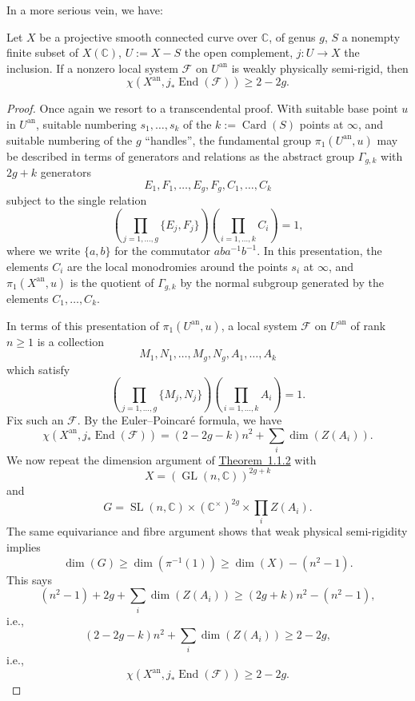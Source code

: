 In a more serious vein, we have:

\setcounter{theorem}{2}
\begin{proposition}
\label{prop:1.2.3}
Let \(X\) be a projective smooth connected curve over \(\mathbb{C}\), of genus
\(g\), \(S\) a nonempty finite subset of \(X(\mathbb{C})\),
\(U:=X-S\) the open complement, \(j:U\to X\) the inclusion. If a nonzero local
system \(\mathcal{F}\) on \(U^{\mathrm{an}}\) is weakly physically semi-rigid,
then
\[
  \chi(X^{\mathrm{an}},j_*\operatorname{End}(\mathcal{F}))\geq 2-2g.
\]
\end{proposition}

\begin{proof}
Once again we resort to a transcendental proof. With suitable base point \(u\)
in \(U^{\mathrm{an}}\), suitable numbering \(s_1,\ldots,s_k\) of the
\(k:=\operatorname{Card}(S)\) points at \(\infty\), and suitable numbering of
the \(g\) ``handles'', the fundamental group \(\pi_1(U^{\mathrm{an}},u)\) may
be described in terms of generators and relations as the abstract group
\(\Gamma_{g,k}\) with \(2g+k\) generators
\[
  E_1,F_1,\ldots,E_g,F_g,C_1,\ldots,C_k
\]
subject to the single relation
\[
  \left(\prod_{j=1,\ldots,g}\{E_j,F_j\}\right)
  \left(\prod_{i=1,\ldots,k} C_i\right)=1,
\]
where we write \(\{a,b\}\) for the commutator \(aba^{-1}b^{-1}\). In this
presentation, the elements \(C_i\) are the local monodromies around the points
\(s_i\) at \(\infty\), and \(\pi_1(X^{\mathrm{an}},u)\) is the quotient of
\(\Gamma_{g,k}\) by the normal subgroup generated by the elements
\(C_1,\ldots,C_k\).

In terms of this presentation of \(\pi_1(U^{\mathrm{an}},u)\), a local system
\(\mathcal{F}\) on \(U^{\mathrm{an}}\) of rank \(n\geq 1\) is a collection
\[
  M_1,N_1,\ldots,M_g,N_g,A_1,\ldots,A_k
\]
which satisfy
\[
  \left(\prod_{j=1,\ldots,g}\{M_j,N_j\}\right)
  \left(\prod_{i=1,\ldots,k} A_i\right)=1.
\]
Fix such an \(\mathcal{F}\). By the Euler--Poincaré formula, we have
\[
  \chi(X^{\mathrm{an}},j_*\operatorname{End}(\mathcal{F}))
  =
  (2-2g-k)n^2+\sum_i\dim(Z(A_i)).
\]
We now repeat the dimension argument of
\hyperref[thm:1.1.2]{Theorem~1.1.2} with
\[
  X=(\operatorname{GL}(n,\mathbb{C}))^{2g+k}
\]
and
\[
  G=\operatorname{SL}(n,\mathbb{C})\times(\mathbb{C}^{\times})^{2g}
    \times\prod_i Z(A_i).
\]
The same equivariance and fibre argument shows that weak physical semi-rigidity
implies
\[
  \dim(G)\geq \dim(\pi^{-1}(1))\geq \dim(X)-(n^2-1).
\]
This says
\[
  (n^2-1)+2g+\sum_i\dim(Z(A_i))\geq (2g+k)n^2-(n^2-1),
\]
i.e.,
\[
  (2-2g-k)n^2+\sum_i\dim(Z(A_i))\geq 2-2g,
\]
i.e.,
\[
  \chi(X^{\mathrm{an}},j_*\operatorname{End}(\mathcal{F}))\geq 2-2g.
\]
\end{proof}

